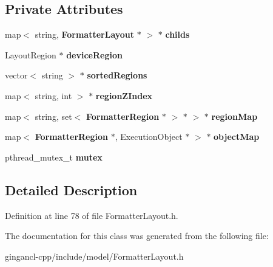 \subsection*{Private Attributes}
\begin{CompactItemize}
\item 
map$<$ string, {\bf FormatterLayout} $\ast$ $>$ $\ast$ {\bf childs}\label{classbr_1_1pucrio_1_1telemidia_1_1ginga_1_1ncl_1_1model_1_1presentation_1_1FormatterLayout_3a79648afedb292370789b3d22973642}

\item 
LayoutRegion $\ast$ {\bf deviceRegion}\label{classbr_1_1pucrio_1_1telemidia_1_1ginga_1_1ncl_1_1model_1_1presentation_1_1FormatterLayout_8acc4f543ede50497a0583a28c6984a8}

\item 
vector$<$ string $>$ $\ast$ {\bf sortedRegions}\label{classbr_1_1pucrio_1_1telemidia_1_1ginga_1_1ncl_1_1model_1_1presentation_1_1FormatterLayout_f2ef98c3adc8c841bd9642ef4f9da26b}

\item 
map$<$ string, int $>$ $\ast$ {\bf regionZIndex}\label{classbr_1_1pucrio_1_1telemidia_1_1ginga_1_1ncl_1_1model_1_1presentation_1_1FormatterLayout_def703a972923de794a833f6ee60d944}

\item 
map$<$ string, set$<$ {\bf FormatterRegion} $\ast$ $>$ $\ast$ $>$ $\ast$ {\bf regionMap}\label{classbr_1_1pucrio_1_1telemidia_1_1ginga_1_1ncl_1_1model_1_1presentation_1_1FormatterLayout_5ebd0ef634bdd3545df982111217d01f}

\item 
map$<$ {\bf FormatterRegion} $\ast$, ExecutionObject $\ast$ $>$ $\ast$ {\bf objectMap}\label{classbr_1_1pucrio_1_1telemidia_1_1ginga_1_1ncl_1_1model_1_1presentation_1_1FormatterLayout_56e0e0eb8a5db452a44dc5856a1f6562}

\item 
pthread\_\-mutex\_\-t {\bf mutex}\label{classbr_1_1pucrio_1_1telemidia_1_1ginga_1_1ncl_1_1model_1_1presentation_1_1FormatterLayout_4acff8232e4aec9cd5c6dc200ac55ef3}

\end{CompactItemize}


\subsection{Detailed Description}




Definition at line 78 of file FormatterLayout.h.

The documentation for this class was generated from the following file:\begin{CompactItemize}
\item 
gingancl-cpp/include/model/FormatterLayout.h\end{CompactItemize}
